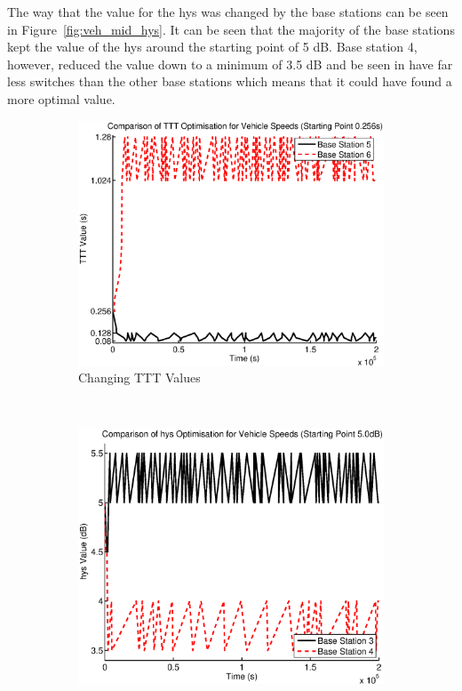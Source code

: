 The way that the value for the hys was changed by the base stations can be seen in Figure~\ref{fig:veh_mid_hys}. It can be seen that the majority of the base stations kept the value of the hys around the starting point of 5 dB. Base station 4, however, reduced the value down to a minimum of 3.5 dB and be seen in have far less switches than the other base stations which means that it could have found a more optimal value.
\begin{figure}[H]
        \centering
        \begin{subfigure}[b]{0.49\textwidth}
                \includegraphics[width=\textwidth]{figures/vehicle_figures/mid/long_ttt.eps}
                \caption{Changing TTT Values}
                \label{fig:veh_mid_ttt}
        \end{subfigure}%
        ~ %
        \begin{subfigure}[b]{0.49\textwidth}
                \includegraphics[width=\textwidth]{figures/vehicle_figures/mid/long_hys.eps}

\end{subfigure}
\end{figure}
